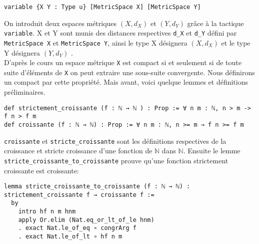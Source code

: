 \documentclass[a4paper, 12pt]{article}
\newcommand{\lean}[1]{\texttt{#1}}
\begin{document}
\begin{verbatim}
variable {X Y : Type u} [MetricSpace X] [MetricSpace Y]
\end{verbatim}

On introduit deux espaces métriques $(X,d_{X})$ et  $(Y,d_{Y})$ grâce à la tactique \lean{variable}. X et Y sont munis des distances respectives \lean{d_{X}} et \lean{d_{Y}} défini par \lean{MetricSpace X} et \lean{MetricSpace Y}, ainsi le type X désignera  $(X,d_{X})$ et le type Y désignera $(Y,d_{Y})$ .\\

D'après le cours un espace métrique \lean{X} est compact si et seulement si de toute suite d'éléments de \lean{X} on peut extraire une sous-suite convergente. Nous définirons un compact par cette propriété. Mais avant, voici quelque lemmes et définitions préliminaires. 

\begin{verbatim}
def strictement_croissante (f : ℕ → ℕ ) : Prop := ∀ n m : ℕ, n > m -> f n > f m
def croissante (f : ℕ → ℕ) : Prop := ∀ n m : ℕ, n >= m → f n >= f m
\end{verbatim}

\lean{croissante} et \lean{stricte_croissante} sont les définitions respectives de la croissance et stricte croissance d'une fonction de $\mathbb{N}$ dans $\mathbb{N}$. Ensuite le lemme \lean{stricte_croissante_to_croissante} prouve qu'une fonction strictement croissante est croissante:

\begin{verbatim}
lemma stricte_croissante_to_croissante (f : ℕ → ℕ) : strictement_croissante f → croissante f :=
  by
    intro hf n m hnm
    apply Or.elim (Nat.eq_or_lt_of_le hnm)
    . exact Nat.le_of_eq ∘ congrArg f
    . exact Nat.le_of_lt ∘ hf n m
    
\end{verbatim}
\end{document}
